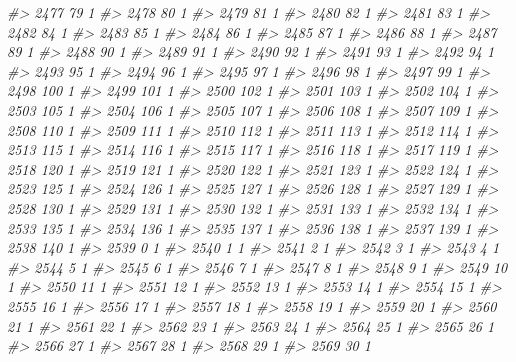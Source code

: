 \documentclass[]{article}
\newenvironment{Shaded}{\begin{snugshade}}{\end{snugshade}}
\newcommand{\CommentTok}[1]{\textcolor[rgb]{0.56,0.35,0.01}{\textit{#1}}}
\begin{document}
\begin{Shaded}
\begin{Highlighting}[]
\CommentTok{#> 2477  79  1}
\CommentTok{#> 2478  80  1}
\CommentTok{#> 2479  81  1}
\CommentTok{#> 2480  82  1}
\CommentTok{#> 2481  83  1}
\CommentTok{#> 2482  84  1}
\CommentTok{#> 2483  85  1}
\CommentTok{#> 2484  86  1}
\CommentTok{#> 2485  87  1}
\CommentTok{#> 2486  88  1}
\CommentTok{#> 2487  89  1}
\CommentTok{#> 2488  90  1}
\CommentTok{#> 2489  91  1}
\CommentTok{#> 2490  92  1}
\CommentTok{#> 2491  93  1}
\CommentTok{#> 2492  94  1}
\CommentTok{#> 2493  95  1}
\CommentTok{#> 2494  96  1}
\CommentTok{#> 2495  97  1}
\CommentTok{#> 2496  98  1}
\CommentTok{#> 2497  99  1}
\CommentTok{#> 2498 100  1}
\CommentTok{#> 2499 101  1}
\CommentTok{#> 2500 102  1}
\CommentTok{#> 2501 103  1}
\CommentTok{#> 2502 104  1}
\CommentTok{#> 2503 105  1}
\CommentTok{#> 2504 106  1}
\CommentTok{#> 2505 107  1}
\CommentTok{#> 2506 108  1}
\CommentTok{#> 2507 109  1}
\CommentTok{#> 2508 110  1}
\CommentTok{#> 2509 111  1}
\CommentTok{#> 2510 112  1}
\CommentTok{#> 2511 113  1}
\CommentTok{#> 2512 114  1}
\CommentTok{#> 2513 115  1}
\CommentTok{#> 2514 116  1}
\CommentTok{#> 2515 117  1}
\CommentTok{#> 2516 118  1}
\CommentTok{#> 2517 119  1}
\CommentTok{#> 2518 120  1}
\CommentTok{#> 2519 121  1}
\CommentTok{#> 2520 122  1}
\CommentTok{#> 2521 123  1}
\CommentTok{#> 2522 124  1}
\CommentTok{#> 2523 125  1}
\CommentTok{#> 2524 126  1}
\CommentTok{#> 2525 127  1}
\CommentTok{#> 2526 128  1}
\CommentTok{#> 2527 129  1}
\CommentTok{#> 2528 130  1}
\CommentTok{#> 2529 131  1}
\CommentTok{#> 2530 132  1}
\CommentTok{#> 2531 133  1}
\CommentTok{#> 2532 134  1}
\CommentTok{#> 2533 135  1}
\CommentTok{#> 2534 136  1}
\CommentTok{#> 2535 137  1}
\CommentTok{#> 2536 138  1}
\CommentTok{#> 2537 139  1}
\CommentTok{#> 2538 140  1}
\CommentTok{#> 2539   0  1}
\CommentTok{#> 2540   1  1}
\CommentTok{#> 2541   2  1}
\CommentTok{#> 2542   3  1}
\CommentTok{#> 2543   4  1}
\CommentTok{#> 2544   5  1}
\CommentTok{#> 2545   6  1}
\CommentTok{#> 2546   7  1}
\CommentTok{#> 2547   8  1}
\CommentTok{#> 2548   9  1}
\CommentTok{#> 2549  10  1}
\CommentTok{#> 2550  11  1}
\CommentTok{#> 2551  12  1}
\CommentTok{#> 2552  13  1}
\CommentTok{#> 2553  14  1}
\CommentTok{#> 2554  15  1}
\CommentTok{#> 2555  16  1}
\CommentTok{#> 2556  17  1}
\CommentTok{#> 2557  18  1}
\CommentTok{#> 2558  19  1}
\CommentTok{#> 2559  20  1}
\CommentTok{#> 2560  21  1}
\CommentTok{#> 2561  22  1}
\CommentTok{#> 2562  23  1}
\CommentTok{#> 2563  24  1}
\CommentTok{#> 2564  25  1}
\CommentTok{#> 2565  26  1}
\CommentTok{#> 2566  27  1}
\CommentTok{#> 2567  28  1}
\CommentTok{#> 2568  29  1}
\CommentTok{#> 2569  30  1}

\end{Highlighting}
\end{Shaded}
\end{document}

